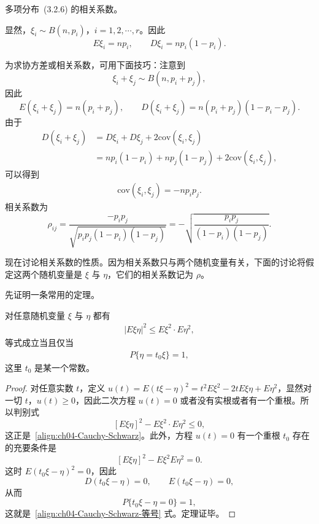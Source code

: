 \documentclass[../../main.tex]{subfiles}
\begin{document}
\begin{example}[多项分布的相关系数]\label{example:ch04-多项分布相关系数}
多项分布~(3.2.6) 的相关系数。

显然，$\xi_i\sim B(n,p_i)$，$i=1,2,\cdots,r$。因此
\[
E\xi_i=np_i,\qquad D\xi_i=np_i(1-p_i).
\]

为求协方差或相关系数，可用下面技巧：注意到
\[
\xi_i+\xi_j\sim B(n,p_i+p_j),
\]
因此
\[
E(\xi_i+\xi_j)=n(p_i+p_j),\qquad D(\xi_i+\xi_j)=n(p_i+p_j)(1-p_i-p_j).
\]
由于
\begin{align*}
D(\xi_i+\xi_j)&=D\xi_i+D\xi_j+2\mathrm{cov}(\xi_i,\xi_j)\\
&=np_i(1-p_i)+np_j(1-p_j)+2\mathrm{cov}(\xi_i,\xi_j),
\end{align*}
可以得到
\begin{align}
\mathrm{cov}(\xi_i,\xi_j)=-np_i p_j.\label{align:ch04-多项分布协方差}
\end{align}
相关系数为
\[
\rho_{ij}=\frac{-p_i p_j}{\sqrt{p_i p_j(1-p_i)(1-p_j)}}
=-\sqrt{\frac{p_i p_j}{(1-p_i)(1-p_j)}}.
\]
\end{example}

现在讨论相关系数的性质。因为相关系数只与两个随机变量有关，下面的讨论将假定这两个随机变量是 $\xi$ 与 $\eta$，它们的相关系数记为 $\rho$。

先证明一条常用的定理。

\begin{theorem}\label{theorem:ch04-Cauchy-Schwarz}
对任意随机变量 $\xi$ 与 $\eta$ 都有
\begin{align}
|E\xi\eta|^2\leqslant E\xi^2\cdot E\eta^2,\label{align:ch04-Cauchy-Schwarz}
\end{align}
等式成立当且仅当
\begin{align}
P\{\eta=t_0\xi\}=1,\label{align:ch04-Cauchy-Schwarz-等号}
\end{align}
这里 $t_0$ 是某一个常数。
\end{theorem}

\begin{proof}
对任意实数 $t$，定义 $u(t)=E(t\xi-\eta)^2=t^2 E\xi^2-2tE\xi\eta+E\eta^2$，显然对一切 $t$，$u(t)\geqslant 0$，因此二次方程 $u(t)=0$ 或者没有实根或者有一个重根。所以判别式
\[
[E\xi\eta]^2-E\xi^2\cdot E\eta^2\leqslant 0,
\]
这正是~\eqref{align:ch04-Cauchy-Schwarz}。此外，方程 $u(t)=0$ 有一个重根 $t_0$ 存在的充要条件是
\[
[E\xi\eta]^2-E\xi^2 E\eta^2=0.
\]
这时 $E(t_0\xi-\eta)^2=0$，因此
\[
D(t_0\xi-\eta)=0,\qquad E(t_0\xi-\eta)=0,
\]
从而
\[
P\{t_0\xi-\eta=0\}=1,
\]
这就是~\eqref{align:ch04-Cauchy-Schwarz-等号} 式。定理证毕。
\end{proof}
\end{document}
